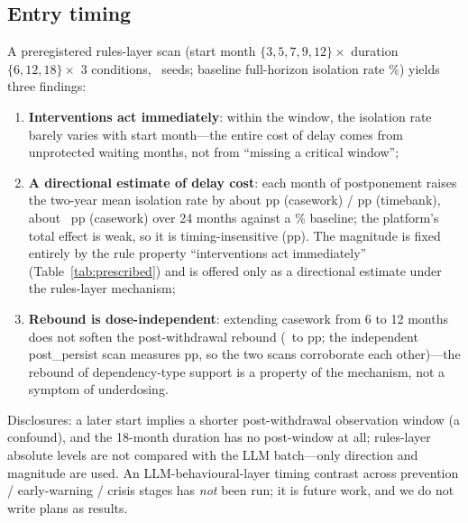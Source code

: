 \documentclass[10pt,twocolumn]{article}
\begin{document}
\subsection{Entry timing}
A preregistered rules-layer scan (start month $\{3,5,7,9,12\}\times$ duration $\{6,12,18\}\times$ 3 conditions, \TimingSeeds\ seeds; baseline full-horizon isolation rate \RulesBaselineOverall\%) yields three findings:
\begin{enumerate}
  \item \textbf{Interventions act immediately}: within the window, the isolation rate barely varies with start month---the entire cost of delay comes from unprotected waiting months, not from ``missing a critical window'';
  \item \textbf{A directional estimate of delay cost}: each month of postponement raises the two-year mean isolation rate by about \DelayCostCasework pp (casework) / \DelayCostTimebank pp (timebank), about \DelayCumCasework\ pp (casework) over 24 months against a \RulesBaselineOverall\% baseline; the platform's total effect is weak, so it is timing-insensitive (\DelayCostPlatform pp). The magnitude is fixed entirely by the rule property ``interventions act immediately'' (Table~\ref{tab:prescribed}) and is offered only as a directional estimate under the rules-layer mechanism;
  \item \textbf{Rebound is dose-independent}: extending casework from 6 to 12 months does not soften the post-withdrawal rebound (\RulesRebCwLo\ to \RulesRebCwHi pp; the independent post\_persist scan measures \PPRebCw pp, so the two scans corroborate each other)---the rebound of dependency-type support is a property of the mechanism, not a symptom of underdosing.
\end{enumerate}
Disclosures: a later start implies a shorter post-withdrawal observation window (a confound), and the 18-month duration has no post-window at all; rules-layer absolute levels are not compared with the LLM batch---only direction and magnitude are used. An LLM-behavioural-layer timing contrast across prevention / early-warning / crisis stages has \emph{not} been run; it is future work, and we do not write plans as results.
\end{document}
